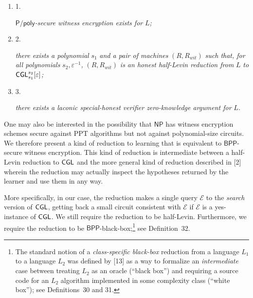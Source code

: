 \begin{enumerate}


\item[] 
1. 


${\mathsf{P}}/{\mathsf{poly}}$\emph{-secure witness encryption exists for }$L$\emph{;}\par





\item[] 
2. 


\emph{there exists a polynomial }$s_{1}$\emph{ and a pair of machines }$(R,R_{wit})$\emph{ such that, for all polynomials }$s_{2},\varepsilon^{-1}$\emph{, }$(R,R_{wit})$\emph{ is an honest half-Levin reduction from }$L$\emph{ to }${\sf CGL}^{s_{2}}_{s_{1}}[\varepsilon]$\emph{;}\par





\item[] 
3. 


\emph{there exists a laconic special-honest verifier zero-knowledge argument for }$L$\emph{.}\par





\end{enumerate}






One may also be interested in the possibility that ${\mathsf{NP}}$ has witness encryption schemes secure against PPT algorithms but not against polynomial-size circuits. We therefore present a kind of reduction to learning that is equivalent to ${\mathsf{BPP}}$-secure witness encryption. This kind of reduction is intermediate between a half-Levin reduction to ${\sf CGL}$ and the more general kind of reduction described in [2] wherein the reduction may actually inspect the hypotheses returned by the learner and use them in any way.\par




More specifically, in our case, the reduction makes a single query $\mathcal{E}$ to the \emph{search} version of ${\sf CGL}$, getting back a small circuit consistent with $\mathcal{E}$ if $\mathcal{E}$ is a yes-instance of ${\sf CGL}$. We still require the reduction to be half-Levin. Furthermore, we require the reduction to be ${\mathsf{BPP}}$-black-box;\footnote{The standard notion of a \emph{class-specific black-box} reduction from a language $L_{1}$ to a language $L_{2}$ was defined by [13] as a way to formalize an \emph{intermediate} case between treating $L_{2}$ as an oracle (“black box”) and requiring a source code for an $L_{2}$ algorithm implemented in some complexity class (“white box”); see Definitions 30 and 31.} see Definition 32.\par




